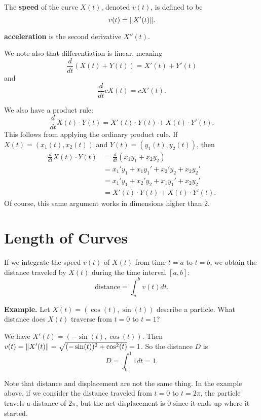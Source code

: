 \documentclass{article}
\begin{document}
The \textbf{speed} of the curve $X(t)$, denoted $v(t)$, is defined to be 
\[v(t) = \norm{X'(t)}.\]

\textbf{acceleration} is the second derivative $X''(t)$.

We note also that differentiation is linear, meaning
\[\frac{d}{dt} \left( X(t) + Y(t) \right) = X'(t) + Y'(t)\]
and 
\[\frac{d}{dt} cX(t) = cX'(t).\]

We also have a product rule:
\[\frac{d}{dt} X(t) \cdot Y(t) = X'(t)\cdot Y(t) + X(t) \cdot Y'(t).\]
This follows from applying the ordinary product rule. If $X(t) = (x_1(t), x_2(t))$ and
$Y(t) = (y_1(t), y_2(t))$, then
\begin{align*}
    \frac{d}{dt} X(t) \cdot Y(t) &= \frac{d}{dt} (x_1y_1 + x_2y_2)\\
    &= x_1'y_1 + x_1y_1' + x_2'y_2 + x_2y_2'\\
    &= x_1'y_1 + x_2'y_2 + x_1y_1' + x_2y_2'\\
    &= X'(t)\cdot Y(t) + X(t) \cdot Y'(t).
\end{align*}
Of course, this same argument works in dimensions higher than 2.
\section*{Length of Curves}
If we integrate the speed $v(t)$ of $X(t)$ from time $t=a$ to $t=b$,
we obtain the distance traveled by $X(t)$ during the time interval $[a,b]$:
\[\text{distance} = \int_a^b v(t)dt.\]

\textbf{Example.} Let $X(t) = (\cos(t), \sin(t))$ describe a particle.
What distance does $X(t)$ traverse from $t=0$ to $t=1$?

We have $X'(t)=(-\sin(t), \cos(t))$. Then $v(t) = \norm{X'(t)} 
= \sqrt{(-\sin(t))^2 + \cos^2(t)} = 1$. So the distance $D$ is 
\[D = \int_0^1 1 dt = 1.\]

Note that distance and displacement are not the same thing. In the example above,
if we consider the distance traveled from $t=0$ to $t=2\pi$, the particle
travels a distance of $2\pi$, but the net displacement is $0$ since it
ends up where it started.
\end{document}
